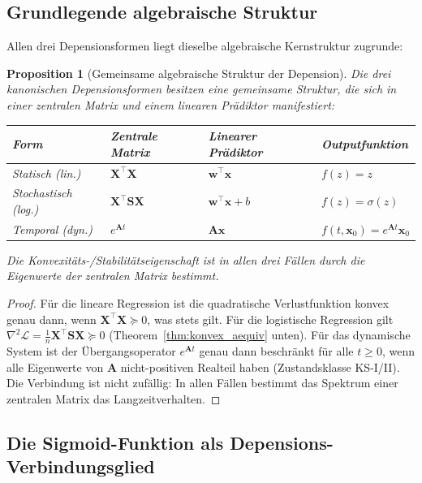 ﻿\documentclass[12pt, a4paper]{article}
\newtheorem{proposition}[theorem]{Proposition}
\theoremstyle{definition}
\theoremstyle{remark}
\newcommand{\sigmoid}{\sigma}
\newcommand{\vw}{\bm{w}}
\newcommand{\vx}{\bm{x}}
\newcommand{\vX}{\bm{X}}
\newcommand{\vA}{\bm{A}}
\newcommand{\vS}{\bm{S}}
\newcommand{\T}{\top}
\begin{document}
\subsection{Grundlegende algebraische Struktur}

Allen drei Depensionsformen liegt dieselbe algebraische Kernstruktur zugrunde:

\begin{proposition}[Gemeinsame algebraische Struktur der Depension]
\label{prop:struktur}
Die drei kanonischen Depensionsformen besitzen eine gemeinsame Struktur, die sich
in einer zentralen Matrix und einem linearen Prädiktor manifestiert:

\begin{center}
\renewcommand{\arraystretch}{1.6}
\begin{tabular}{llll}
\toprule
Form & Zentrale Matrix & Linearer Prädiktor & Outputfunktion \\
\midrule
Statisch (lin.) & $\vX^\T\vX$ & $\vw^\T\vx$ & $f(z) = z$ \\
Stochastisch (log.) & $\vX^\T\vS\vX$ & $\vw^\T\vx + b$ & $f(z) = \sigmoid(z)$ \\
Temporal (dyn.) & $e^{\vA t}$ & $\vA\vx$ & $f(t,\vx_0) = e^{\vA t}\vx_0$ \\
\bottomrule
\end{tabular}
\end{center}
Die Konvexitäts-/Stabilitätseigenschaft ist in allen drei Fällen durch die
Eigenwerte der zentralen Matrix bestimmt.
\end{proposition}

\begin{proof}
Für die lineare Regression ist die quadratische Verlustfunktion konvex genau dann,
wenn $\vX^\T\vX \succeq 0$, was stets gilt. Für die logistische Regression gilt
$\nabla^2\mathcal{L} = \frac{1}{n}\vX^\T\vS\vX \succeq 0$ (Theorem~\ref{thm:konvex_aequiv}
unten). Für das dynamische System ist der Übergangsoperator $e^{\vA t}$ genau dann
beschränkt für alle $t \geq 0$, wenn alle Eigenwerte von $\vA$ nicht-positiven Realteil
haben (Zustandsklasse KS-I/II). Die Verbindung ist nicht zufällig: In allen Fällen
bestimmt das Spektrum einer zentralen Matrix das Langzeitverhalten.
\end{proof}

\subsection{Die Sigmoid-Funktion als Depensions-Verbindungsglied}
\end{document}
